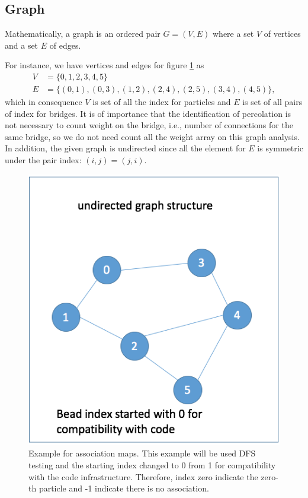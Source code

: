 \documentclass[10pt, a4paper]{article}
\begin{document}
\begin{appendices}
\subsection{Graph}
\label{sec:orgheadline14}
Mathematically, a graph is an ordered pair \(G = (V, E)\) where a set \(V\) of vertices and a set \(E\) of edges. 

For instance, we have vertices and edges for figure \ref{orgkeyword3} as 
\begin{align}
V &= \{0, 1, 2, 3, 4, 5\}\\
E &= \{(0, 1), (0, 3), (1, 2), (2, 4), (2, 5), (3, 4), (4, 5)\},
\end{align}
which in consequence \(V\) is set of all the index for particles and \(E\) is set of all pairs of index for bridges. It is of importance that the identification of percolation is not necessary to count weight on the bridge, i.e., number of connections for the same bridge, so we do not need count all the weight array on this graph analysis. In addition, the given graph is undirected since all the element for \(E\) is symmetric under the pair index: \((i, j) = (j, i)\). 

\begin{figure}
\centering
\includegraphics[width=.9\linewidth]{../data_structure/ex_graph_DFS.png}
\caption{Example for association maps. This example will be used DFS testing and the starting index  changed to 0 from 1 for compatibility with the code infrastructure. Therefore, index zero indicate the zero-th particle and -1 indicate there is no association.}
\label{orgkeyword3}
\end{figure}


\end{appendices}
\end{document}
